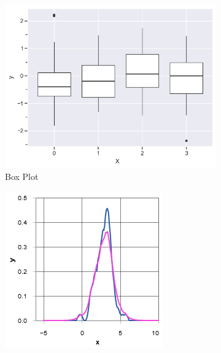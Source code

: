 \begin{figure}
    \centering
    \begin{subfigure}[b]{0.29\textwidth}
        \centering
        \includegraphics[width=\textwidth]{figures/body/methodology/norm_box.png}
        \caption{Box Plot}
        \label{figure:norm_box}
    \end{subfigure}
    \begin{subfigure}[b]{0.29\textwidth}
        \centering
        \includegraphics[width=\textwidth]{figures/body/methodology/norm_kd.png}

\end{subfigure}
\end{figure}
